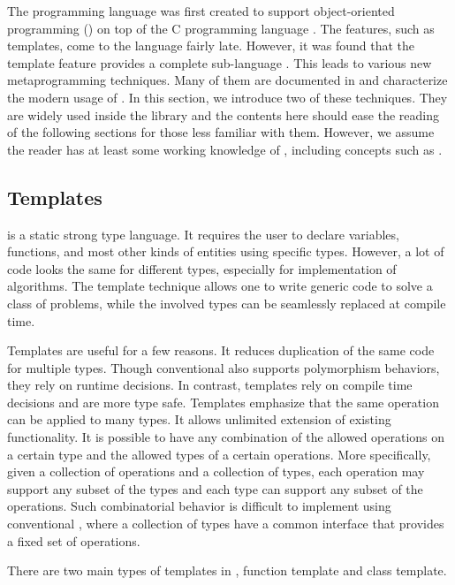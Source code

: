 The \cpp programming language \cite{cpp03} was first created to support object-oriented programming (\oop) on top of the C programming language \cite{evolutioncpp}. The features, such as templates, come to the language fairly late. However, it was found that the \cpp template feature provides a complete sub-language \cite{cpptemplateturing}. This leads to various new metaprogramming techniques. Many of them are documented in \cite{moderncpp} and characterize the modern usage of \cpp. In this section, we introduce two of these techniques. They are widely used inside the \vsmc library and the contents here should ease the reading of the following sections for those less familiar with them. However, we assume the reader has at least some working knowledge of \cpp, including concepts such as \oop.

\subsection{Templates}
\label{sub:Templates}

\cpp is a static strong type language. It requires the user to declare variables, functions, and most other kinds of entities using specific types. However, a lot of code looks the same for different types, especially for implementation of algorithms. The \cpp template technique allows one to write generic code to solve a class of problems, while the involved types can be seamlessly replaced at compile time.

Templates are useful for a few reasons. It reduces duplication of the same code for multiple types. Though conventional \oop also supports polymorphism behaviors, they rely on runtime decisions. In contrast, templates rely on compile time decisions and are more type safe. Templates emphasize that the same operation can be applied to many types. It allows unlimited extension of existing functionality. It is possible to have any combination of the allowed operations on a certain type and the allowed types of a certain operations. More specifically, given a collection of operations and a collection of types, each operation may support any subset of the types and each type can support any subset of the operations. Such combinatorial behavior is difficult to implement using conventional \oop, where a collection of types have a common interface that provides a fixed set of operations.

There are two main types of templates in \cpp, function template and class template.

